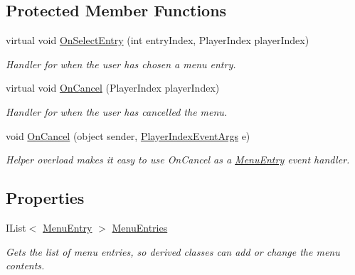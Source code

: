 \subsection*{Protected Member Functions}
\begin{DoxyCompactItemize}
\item 
virtual void \hyperlink{classCityMania_1_1MenuScreen_a43061349ad3024e285e418cb1716e887}{OnSelectEntry} (int entryIndex, PlayerIndex playerIndex)
\begin{DoxyCompactList}\small\item\em Handler for when the user has chosen a menu entry. \item\end{DoxyCompactList}\item 
virtual void \hyperlink{classCityMania_1_1MenuScreen_adba6d36ac9e5f30e2e3c2147c7510bf0}{OnCancel} (PlayerIndex playerIndex)
\begin{DoxyCompactList}\small\item\em Handler for when the user has cancelled the menu. \item\end{DoxyCompactList}\item 
void \hyperlink{classCityMania_1_1MenuScreen_a89a79a688ebc8fdddf3ee1aabb43dad1}{OnCancel} (object sender, \hyperlink{classCityMania_1_1PlayerIndexEventArgs}{PlayerIndexEventArgs} e)
\begin{DoxyCompactList}\small\item\em Helper overload makes it easy to use OnCancel as a \hyperlink{classCityMania_1_1MenuEntry}{MenuEntry} event handler. \item\end{DoxyCompactList}\end{DoxyCompactItemize}
\subsection*{Properties}
\begin{DoxyCompactItemize}
\item 
IList$<$ \hyperlink{classCityMania_1_1MenuEntry}{MenuEntry} $>$ \hyperlink{classCityMania_1_1MenuScreen_a62f17cbe5d646e7ba2e9d8b129069e22}{MenuEntries}
\begin{DoxyCompactList}\small\item\em Gets the list of menu entries, so derived classes can add or change the menu contents. \item\end{DoxyCompactList}\end{DoxyCompactItemize}


